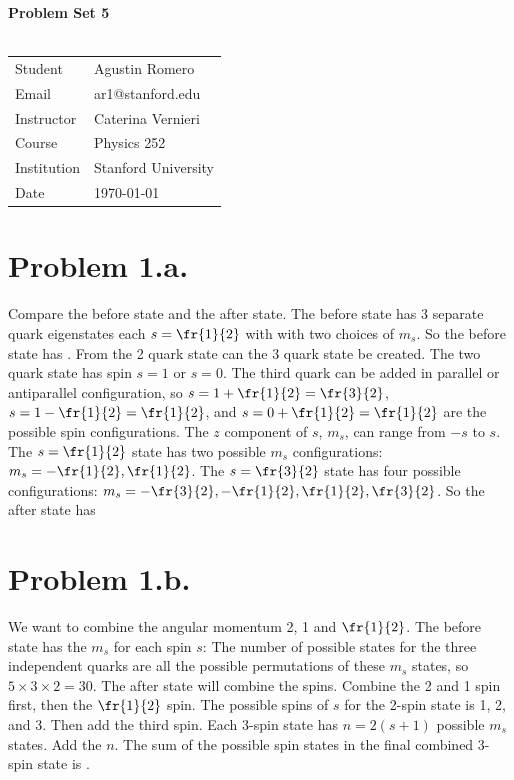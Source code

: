\documentclass{article}
\begin{document}
\begin{center}
\textbf{\Large{Problem Set 5}}\\~\\
\begin{tabular}{l l}
Student&Agustin Romero\\
Email&ar1@stanford.edu\\
Instructor&Caterina Vernieri\\
Course&Physics 252\\
Institution&Stanford University\\
Date&\today\\
\end{tabular}
\end{center}
\section*{Problem 1.a.} 
Compare the before state and the after state. The before state has 3 separate quark eigenstates each $s=\fr{1}{2}$ with with two choices of $m_s$.
So the before state has . From the 2 quark state can the 3 quark state be created. The two quark state has spin $s=1$ or $s=0$. The third quark can be added in parallel or antiparallel configuration, so $s=1+\fr{1}{2}=\fr{3}{2}$, $s=1-\fr{1}{2}=\fr{1}{2}$, and $s=0+\fr{1}{2}=\fr{1}{2}$ are the possible spin configurations. The $z$ component of $s$, $m_s$, can range from $-s$ to $s$. The $s=\fr{1}{2}$ state has two possible $m_s$ configurations: $m_s=-\fr{1}{2},\fr{1}{2}$. The $s=\fr{3}{2}$ state has four possible configurations: $m_s=-\fr{3}{2},-\fr{1}{2},\fr{1}{2},\fr{3}{2}$. So the after state has  
\section*{Problem 1.b.}
We want to combine the angular momentum 2, 1 and $\fr{1}{2}$. The before state has the $m_s$ for each spin $s$:
The number of possible states for the three independent quarks are all the possible permutations of these $m_s$ states, so $5\times 3\times 2=\boxed{30}$.
The after state will combine the spins. Combine the 2 and 1 spin first, then the $\fr{1}{2}$ spin.
The possible spins of $s$ for the 2-spin state is 1, 2, and 3. Then add the third spin. Each 3-spin state has $n=2(s+1)$ possible $m_s$ states. Add the $n$.
The sum of the possible spin states in the final combined 3-spin state is .
\end{document}
